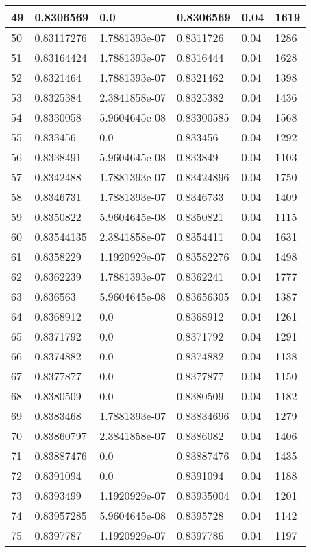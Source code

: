 \begin{longtable}{|l|l|l|l|l|l|}
49 & 0.8306569 & 0.0 & 0.8306569 & 0.04 & 1619 \\ \hline 
50 & 0.83117276 & 1.7881393e-07 & 0.8311726 & 0.04 & 1286 \\ \hline 
51 & 0.83164424 & 1.7881393e-07 & 0.8316444 & 0.04 & 1628 \\ \hline 
52 & 0.8321464 & 1.7881393e-07 & 0.8321462 & 0.04 & 1398 \\ \hline 
53 & 0.8325384 & 2.3841858e-07 & 0.8325382 & 0.04 & 1436 \\ \hline 
54 & 0.8330058 & 5.9604645e-08 & 0.83300585 & 0.04 & 1568 \\ \hline 
55 & 0.833456 & 0.0 & 0.833456 & 0.04 & 1292 \\ \hline 
56 & 0.8338491 & 5.9604645e-08 & 0.833849 & 0.04 & 1103 \\ \hline 
57 & 0.8342488 & 1.7881393e-07 & 0.83424896 & 0.04 & 1750 \\ \hline 
58 & 0.8346731 & 1.7881393e-07 & 0.8346733 & 0.04 & 1409 \\ \hline 
59 & 0.8350822 & 5.9604645e-08 & 0.8350821 & 0.04 & 1115 \\ \hline 
60 & 0.83544135 & 2.3841858e-07 & 0.8354411 & 0.04 & 1631 \\ \hline 
61 & 0.8358229 & 1.1920929e-07 & 0.83582276 & 0.04 & 1498 \\ \hline 
62 & 0.8362239 & 1.7881393e-07 & 0.8362241 & 0.04 & 1777 \\ \hline 
63 & 0.836563 & 5.9604645e-08 & 0.83656305 & 0.04 & 1387 \\ \hline 
64 & 0.8368912 & 0.0 & 0.8368912 & 0.04 & 1261 \\ \hline 
65 & 0.8371792 & 0.0 & 0.8371792 & 0.04 & 1291 \\ \hline 
66 & 0.8374882 & 0.0 & 0.8374882 & 0.04 & 1138 \\ \hline 
67 & 0.8377877 & 0.0 & 0.8377877 & 0.04 & 1150 \\ \hline 
68 & 0.8380509 & 0.0 & 0.8380509 & 0.04 & 1182 \\ \hline 
69 & 0.8383468 & 1.7881393e-07 & 0.83834696 & 0.04 & 1279 \\ \hline 
70 & 0.83860797 & 2.3841858e-07 & 0.8386082 & 0.04 & 1406 \\ \hline 
71 & 0.83887476 & 0.0 & 0.83887476 & 0.04 & 1435 \\ \hline 
72 & 0.8391094 & 0.0 & 0.8391094 & 0.04 & 1188 \\ \hline 
73 & 0.8393499 & 1.1920929e-07 & 0.83935004 & 0.04 & 1201 \\ \hline 
74 & 0.83957285 & 5.9604645e-08 & 0.8395728 & 0.04 & 1142 \\ \hline 
75 & 0.8397787 & 1.1920929e-07 & 0.8397786 & 0.04 & 1197 \\ \hline 
\end{longtable}